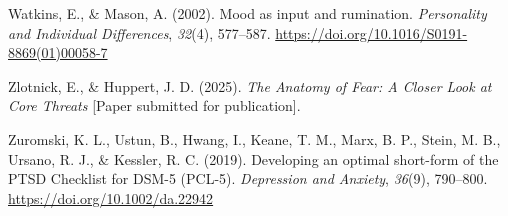 \documentclass[
  man,floatsintext]{apa7}
\newlength{\cslhangindent}
\newlength{\cslentryspacingunit} %
\newenvironment{CSLReferences}[2] %
 {%
  \setlength{\parindent}{0pt}
  \ifodd #1
  \let\oldpar\par
  \def\par{\hangindent=\cslhangindent\oldpar}
  \fi
  \setlength{\parskip}{#2\cslentryspacingunit}
 }%
 {}
\begin{document}
\begin{CSLReferences}{1}{0}
\leavevmode{}%
Watkins, E., \& Mason, A. (2002). Mood as input and rumination. \emph{Personality and Individual Differences}, \emph{32}(4), 577--587. \url{https://doi.org/10.1016/S0191-8869(01)00058-7}

\leavevmode{}%
Zlotnick, E., \& Huppert, J. D. (2025). \emph{The Anatomy of Fear: A Closer Look at Core Threats} {[}Paper submitted for publication{]}.

\leavevmode{}%
Zuromski, K. L., Ustun, B., Hwang, I., Keane, T. M., Marx, B. P., Stein, M. B., Ursano, R. J., \& Kessler, R. C. (2019). Developing an optimal short-form of the PTSD Checklist for DSM-5 (PCL-5). \emph{Depression and Anxiety}, \emph{36}(9), 790--800. \url{https://doi.org/10.1002/da.22942}

\end{CSLReferences}
\end{document}
